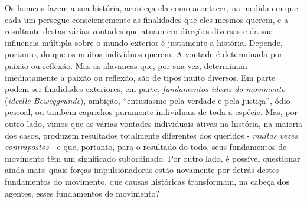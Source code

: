 Os homens fazem a sua história, aconteça ela como acontecer, na medida
em que cada um persegue conscientemente as finalidades que eles mesmos
querem, e a resultante destas várias vontades que atuam em direções
diversas e da sua influencia múltipla sobre o mundo exterior é
justamente a história. Depende, portanto, do que os muitos indivíduos
querem. A vontade é determinada por paixão ou reflexão. Mas as alavancas
que, por sua vez, determinam imediatamente a paixão ou reflexão, são de
tipos muito diversos. Em parte podem ser finalidades exteriores, em
parte, \emph{fundamentos ideais do movimento} (\emph{ideelle
Beweggründe}), ambição, ``entusiasmo pela verdade e pela justiça'', ódio
pessoal, ou também caprichos puramente individuais de toda a espécie.
Mas, por outro lado, vimos que as várias vontades individuais ativas na
história, na maioria dos casos, produzem resultados totalmente
diferentes dos queridos - \emph{muitas vezes contrapostos} - e que,
portanto, para o resultado do todo, seus fundamentos de movimento têm um
significado subordinado. Por outro lado, é possível questionar ainda
mais: quais forças impulsionadoras estão novamente por detrás destes
fundamentos do movimento, que causas históricas transformam, na cabeça
dos agentes, esses fundamentos de movimento?

